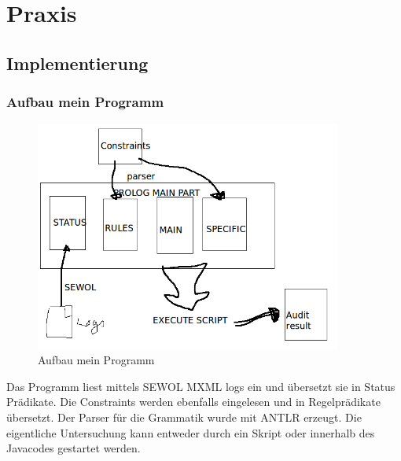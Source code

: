 
\chapter{Praxis} %

\label{Chapter5} %



\section{Implementierung}

\subsection{Aufbau mein Programm}

\begin{figure}[ht]
	\centering
  \includegraphics[width=0.9\textwidth]{"Figures/myProg"}
	\caption{Aufbau mein Programm}
	\label{fig: myprog}
\end{figure}

Das Programm liest mittels SEWOL MXML logs ein und übersetzt sie in Status Prädikate. 
Die Constraints werden ebenfalls eingelesen und in Regelprädikate übersetzt. Der Parser für die Grammatik wurde mit ANTLR\cite{antlr} erzeugt.
Die eigentliche Untersuchung kann entweder durch ein Skript oder innerhalb des Javacodes gestartet werden.


